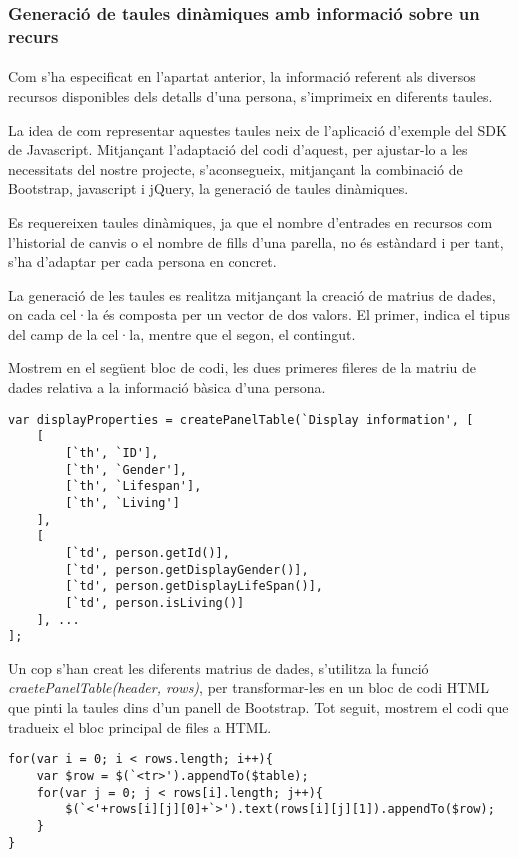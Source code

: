 \subsubsection{Generació de taules dinàmiques amb informació sobre un recurs}

\paragraph{}
Com s'ha especificat en l'apartat anterior, la informació referent als diversos recursos disponibles dels detalls d'una persona, s'imprimeix en diferents taules.

La idea de com representar aquestes taules neix de l'aplicació d'exemple del SDK de Javascript. Mitjançant l'adaptació del codi d'aquest, per ajustar-lo a les necessitats del nostre projecte, s'aconsegueix, mitjançant la combinació de Bootstrap, javascript i jQuery, la generació de taules dinàmiques.

Es requereixen taules dinàmiques, ja que el nombre d'entrades en recursos com l'historial de canvis o el nombre de fills d'una parella, no és estàndard i per tant, s'ha d'adaptar per cada persona en concret.

La generació de les taules es realitza mitjançant la creació de matrius de dades, on cada cel·la és composta per un vector de dos valors. El primer, indica el tipus del camp de la cel·la, mentre que el segon, el contingut.

Mostrem en el següent bloc de codi, les dues primeres fileres de la matriu de dades relativa a la informació bàsica d'una persona.

\begin{lstlisting}[style=rawOwn,caption={Exemple de les dues primeres files, d'una matriu de dades}]
var displayProperties = createPanelTable(`Display information', [
    [
        [`th', `ID'],
        [`th', `Gender'],
        [`th', `Lifespan'],
        [`th', `Living']
    ],
    [
        [`td', person.getId()],
        [`td', person.getDisplayGender()],
        [`td', person.getDisplayLifeSpan()],
        [`td', person.isLiving()]
    ], ...
];
\end{lstlisting}

Un cop s'han creat les diferents matrius de dades, s'utilitza la funció \emph{craetePanelTable(header, rows)}, per transformar-les en un bloc de codi HTML que pinti la taules dins d'un panell de Bootstrap. Tot seguit, mostrem el codi que tradueix el bloc principal de files a HTML.

\begin{lstlisting}[style=rawOwn,caption={Transformació de files d'una matriu en HTML}]
for(var i = 0; i < rows.length; i++){
    var $row = $(`<tr>').appendTo($table);
    for(var j = 0; j < rows[i].length; j++){
        $(`<'+rows[i][j][0]+`>').text(rows[i][j][1]).appendTo($row);
    }
}
\end{lstlisting}
